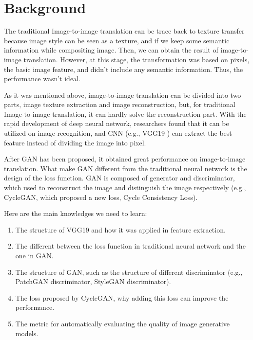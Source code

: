 \section{Background}
The traditional Image-to-image translation can be trace back to texture transfer because image style can be seen as a texture, and if we keep some semantic information while compositing image. Then, we can obtain the result of image-to-image translation. However, at this stage, the transformation was based on pixels, the basic image feature, and didn’t include any semantic information. Thus, the performance wasn’t ideal. 

As it was mentioned above, image-to-image translation can be divided into two parts, image texture extraction and image reconstruction, but, for traditional Image-to-image translation, it can hardly solve the reconstruction part. With the rapid development of deep neural network, researchers found that it can be utilized on image recognition, and CNN (e.g., VGG19 \cite{simonyan2014very}) can extract the best feature instead of dividing the image into pixel. 

After GAN has been proposed, it obtained great performance on image-to-image translation. What make GAN different from the traditional neural network is the design of the loss function. GAN is composed of generator and discriminator, which used to reconstruct the image and distinguish the image respectively (e.g., CycleGAN, which proposed a new loss, Cycle Consistency Loss\cite{zhu_unpaired_2017}). 

Here are the main knowledges we need to learn:
\begin{enumerate}
  \item The structure of VGG19 and how it was applied in feature extraction.
  \item The different between the loss function in traditional neural network and the one in GAN.
  \item The structure of GAN, such as the structure of different discriminator (e.g., PatchGAN discriminator\cite{sym12101705}, StyleGAN discriminator\cite{karras2020analyzing}).
  \item The loss proposed by CycleGAN, why adding this loss can improve the performance.
  \item The metric for automatically evaluating the quality of image generative models\cite{heusel2017gans}\cite{salimans2016improved}.
\end{enumerate}
